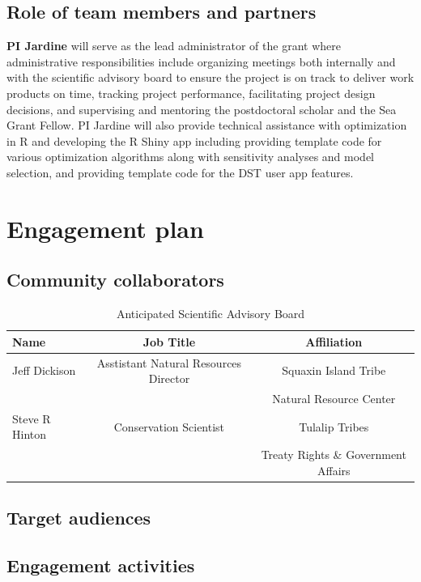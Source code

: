 \documentclass[12pt]{elsarticle}
\begin{document}
\subsection{Role of team members and partners}
\textbf{PI Jardine} will serve as the lead administrator of the grant where administrative responsibilities include organizing meetings both internally and with the scientific advisory board to ensure the project is on track to deliver work products on time, tracking project performance, facilitating project design decisions, and supervising and mentoring the postdoctoral scholar and the Sea Grant Fellow.  PI Jardine will also provide technical assistance with optimization in R and developing the R Shiny app including providing template code for various optimization algorithms along with sensitivity analyses and model selection, and providing template code for the DST user app features.\\


%
\section{Engagement plan}
\subsection{Community collaborators} 

\begin{table}[h]
\caption{Anticipated Scientific Advisory Board \label{tab:sab}}
\centering
\begin{tabular}{lcc}\hline
 Name & Job Title & Affiliation  \\\hline
Jeff Dickison& Asstistant Natural Resources Director &  Squaxin Island Tribe\\
& & Natural Resource Center\\
\rowcolor[gray]{.9} Steve R Hinton &  Conservation Scientist&  Tulalip Tribes  \\
\rowcolor[gray]{.9}& &Treaty Rights \& Government Affairs\\\hline
\end{tabular}
\end{table}


\subsection{Target audiences}



\subsection{Engagement activities}
\end{document}
